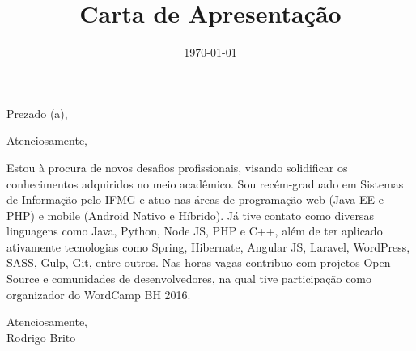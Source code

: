 \documentclass[11pt,a4paper,roman]{moderncv}        %
\title{Carta de Apresentação}                               %
\begin{document}
\date{\today}
\opening{Prezado (a),}
\closing{Atenciosamente,}
\makelettertitle

{\raggedright Estou à procura de novos desafios profissionais, visando solidificar os conhecimentos adquiridos no meio acadêmico. Sou recém-graduado em Sistemas de Informação pelo IFMG e atuo nas áreas de programação web (Java EE e PHP) e mobile (Android Nativo e Híbrido). Já tive contato como diversas linguagens como Java, Python, Node JS, PHP e C++, além de ter aplicado ativamente tecnologias como Spring, Hibernate, Angular JS, Laravel, WordPress, SASS, Gulp, Git, entre outros. Nas horas vagas contribuo com projetos Open Source e comunidades de desenvolvedores, na qual tive participação como organizador do WordCamp BH 2016.}

\vspace{0.5cm}
Atenciosamente,\\
Rodrigo Brito

\end{document}

